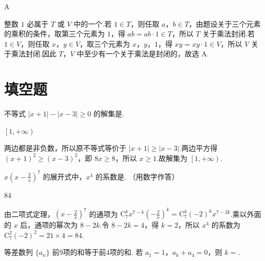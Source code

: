 \begin{answer}
A
\end{answer}

\begin{solution}
整数 \(1\) 必属于 \(T\) 或 \(V\) 中的一个.若 \(1\in T\)，则任取 \(a\)，\(b\in T\)，由题设关于三个元素的乘积的条件，取第三个元素为 \(1\)，得 \(ab=ab\cdot1\in T\)，所以 \(T\) 关于乘法封闭.若 \(1\in V\)，则任取 \(x\)，\(y\in V\)，取三个元素为 \(x\)，\(y\)，\(1\)，得 \(xy=xy\cdot1\in V\)，所以 \(V\) 关于乘法封闭.因此 \(T\)，\(V\) 中至少有一个关于乘法是封闭的，故选 A.
\end{solution}

\section{填空题}

\begin{problem}
不等式 \(|x + 1| - |x - 3| \geqslant 0\) 的解集是\fillinblank{}.
\end{problem}

\begin{answer}
\(\left[1,+\infty\right)\)
\end{answer}

\begin{solution}
两边都是非负数，所以原不等式等价于 \(\lvert x+1\rvert\geqslant\lvert x-3\rvert\).两边平方得 \((x+1)^2\geqslant(x-3)^2\)，即 \(8x\geqslant8\)，所以 \(x\geqslant1\).故解集为 \(\left[1,+\infty\right)\).
\end{solution}

\begin{problem}
\(x\left(x - \frac{2}{x}\right)^7\) 的展开式中，\(x^4\) 的系数是\fillinblank{}. （用数字作答）
\end{problem}

\begin{answer}
84
\end{answer}

\begin{solution}
由二项式定理，\(\left(x-\frac{2}{x}\right)^7\) 的通项为 \(\mathrm C_7^k x^{7-k}\left(-\frac{2}{x}\right)^k=\mathrm C_7^k(-2)^k x^{7-2k}\).乘以外面的 \(x\) 后，通项的幂次为 \(8-2k\).令 \(8-2k=4\)，得 \(k=2\)，所以 \(x^4\) 的系数为 \(\mathrm C_7^2(-2)^2=21\times4=84\).
\end{solution}

\begin{problem}
等差数列 \(\{a_{n}\}\) 前9项的和等于前4项的和. 若 \(a_{1} = 1\)，\(a_{k} + a_{4} = 0\)，则 \(k = \)\fillinblank{}.
\end{problem}

